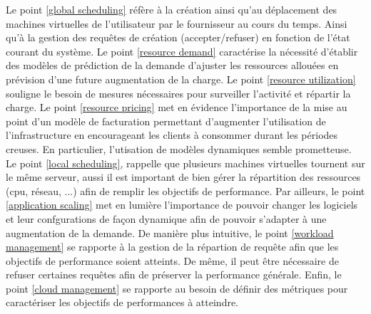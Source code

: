 \documentclass[11pt]{article}
\begin{document}
Le point \ref{global scheduling} réfère à la création ainsi qu'au déplacement des machines virtuelles de l'utilisateur par le fournisseur au cours du temps.
Ainsi qu'à la gestion des requêtes de création (accepter/refuser) en fonction de l'état courant du système. Le point \ref{resource demand} caractérise la 
nécessité d'établir des modèles de prédiction de la demande d'ajuster les ressources allouées en prévision d'une future augmentation de la charge. Le point 
\ref{resource utilization} souligne le besoin de mesures nécessaires pour surveiller l'activité et répartir la charge. Le point \ref{resource pricing} met en évidence 
l'importance de la mise au point d'un modèle de facturation permettant d'augmenter l'utilisation de l'infrastructure en encourageant les clients à consommer durant les
périodes creuses. En particulier, l'utisation de modèles dynamiques semble prometteuse. Le point \ref{local scheduling}, rappelle que plusieurs machines virtuelles 
tournent sur le même serveur, aussi il est important de bien gérer la répartition des ressources (cpu, réseau, ...) afin de remplir les objectifs de performance. Par
ailleurs, le point \ref{application scaling} met en lumière l'importance de pouvoir changer les logiciels et leur confgurations de façon dynamique afin de pouvoir s'adapter
à une augmentation de la demande. De manière plus intuitive, le point \ref{workload management} se rapporte à la gestion de la répartion de requête afin que les objectifs
de performance soient atteints. De même, il peut être nécessaire de refuser certaines requêtes afin de préserver la performance générale. Enfin, le point 
\ref{cloud management} se rapporte au besoin de définir des métriques pour caractériser les objectifs de performances à atteindre.
\end{document}
